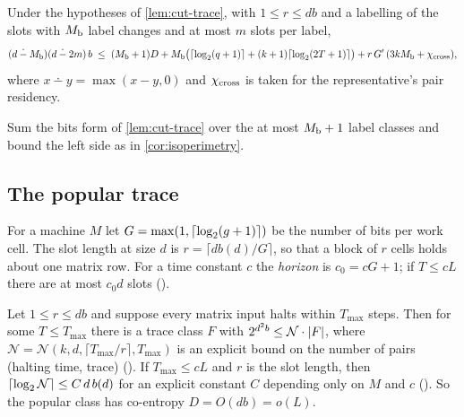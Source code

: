 \begin{corollary}\label{cor:isoperimetry-trace}
Under the hypotheses of \cref{lem:cut-trace}, with $1\le r\le db$ and a labelling of the slots with
$M_{\mathrm{b}}$ label changes and at most $m$ slots per label,
\[
  (d\mathbin{\dot{-}}M_{\mathrm{b}})(d\mathbin{\dot{-}}2m)\,b\;\le\;(M_{\mathrm{b}}+1)D+M_{\mathrm{b}}\bigl(\lceil \log_2 (q+1) \rceil+(k+1)\lceil \log_2 (2T+1) \rceil\bigr)
  +r\,G'\,(3kM_{\mathrm{b}}+\chi_{\mathrm{cross}}),
\]
where $x\dotminus y=\max(x-y,0)$ and $\chi_{\mathrm{cross}}$ is taken for the representative's pair residency.
\end{corollary}

\begin{outline}
Sum the bits form of \cref{lem:cut-trace} over the at most $M_{\mathrm{b}}+1$ label classes and bound the left
side as in \cref{cor:isoperimetry}.
\end{outline}

\subsection{The popular trace}

\begin{definition}\label{def:slotlen}
For a machine $M$ let $G=\max(1,\lceil \log_2 (g+1) \rceil)$ be the number of bits per work cell. The slot
length at size $d$ is $r=\lceil db(d)/G\rceil$, so that a block of $r$ cells holds about one matrix row.
For a time constant $c$ the \emph{horizon} is $c_0=cG+1$; if $T\le cL$ there are at most $c_0d$
slots ().
\end{definition}

\begin{theorem}\label{thm:popular}
Let $1\le r\le db$ and suppose every matrix input halts within $T_{\max}$ steps. Then for some
$T\le T_{\max}$ there is a trace class $F$ with $2^{d^2b}\le\mathcal{N}\cdot\lvert F \rvert$, where
$\mathcal{N}=\mathcal{N}(k,d,\lceil T_{\max}/r\rceil,T_{\max})$ is an explicit bound on the number
of pairs (halting time, trace) (). If $T_{\max}\le cL$ and $r$ is the slot length,
then $\lceil \log_2 \mathcal{N} \rceil\le C\,d\,b(d)$ for an explicit constant $C$ depending only on $M$ and $c$
(). So the popular class has co-entropy $D=O(db)=o(L)$.
\end{theorem}

